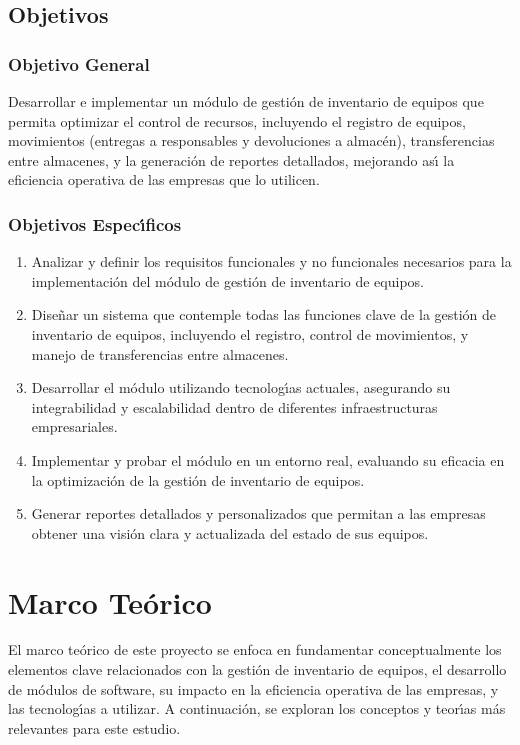 \documentclass[stu, 12pt, letterpaper, donotrepeattitle, floatsintext, natbib]{apa7}
\begin{document}
\subsection{Objetivos}
\subsubsection{Objetivo General}
Desarrollar e implementar un m\'odulo de gesti\'on de inventario de equipos que permita optimizar el control de recursos, incluyendo el registro de equipos,
movimientos (entregas a responsables y devoluciones a almac\'en), transferencias entre almacenes, y la generaci\'on de reportes detallados, mejorando as\'{\i} la
eficiencia operativa de las empresas que lo utilicen.
\subsubsection{Objetivos Espec\'{\i}ficos}
\begin{enumerate}
    \item Analizar y definir los requisitos funcionales y no funcionales necesarios para la implementaci\'on del m\'odulo de gesti\'on de inventario de equipos.
    \item Dise\~{n}ar un sistema que contemple todas las funciones clave de la gesti\'on de inventario de equipos, incluyendo el registro, control de movimientos,
          y manejo de transferencias entre almacenes.
    \item Desarrollar el m\'odulo utilizando tecnolog\'{\i}as actuales, asegurando su integrabilidad y escalabilidad dentro de diferentes infraestructuras empresariales.
    \item Implementar y probar el m\'odulo en un entorno real, evaluando su eficacia en la optimizaci\'on de la gesti\'on de inventario de equipos.
    \item Generar reportes detallados y personalizados que permitan a las empresas obtener una visi\'on clara y actualizada del estado de sus equipos.
\end{enumerate}
\newpage
\section{Marco Te\'orico}
El marco te\'orico de este proyecto se enfoca en fundamentar conceptualmente los elementos clave relacionados con la gesti\'on de inventario de equipos, el
desarrollo de m\'odulos de software, su impacto en la eficiencia operativa de las empresas, y las tecnolog\'{\i}as a utilizar. A continuaci\'on, se exploran los
conceptos y teor\'{\i}as m\'as relevantes para este estudio.
\end{document}
